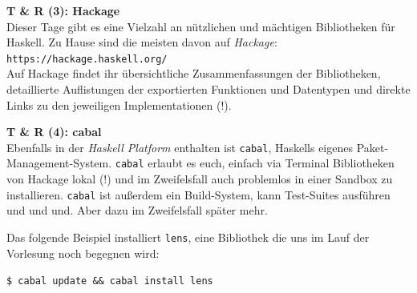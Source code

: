 \documentclass{beamer}
\begin{document}
  
  \begin{frame}
    \begin{center}
    \Large\textbf{T \& R (3): Hackage}\\ \bigskip \normalsize
    Dieser Tage gibt es eine Vielzahl an nützlichen und mächtigen Bibliotheken für Haskell. Zu Hause sind die meisten davon auf \emph{Hackage}: \\ \bigskip \texttt{https://hackage.haskell.org/} \\ \bigskip
    Auf Hackage findet ihr übersichtliche Zusammenfassungen der Bibliotheken, detaillierte Auflistungen der exportierten Funktionen und Datentypen und direkte Links zu den jeweiligen Implementationen (!).
    \end{center}
  \end{frame}
  
  
  \begin{frame}
    \begin{center}
    \Large\textbf{T \& R (4): cabal}\\ \bigskip \normalsize
    Ebenfalls in der \emph{Haskell Platform} enthalten ist \texttt{cabal}, Haskells eigenes Paket-Management-System. \texttt{cabal} erlaubt es euch, einfach via Terminal Bibliotheken von Hackage lokal (!) und im Zweifelsfall auch problemlos in einer Sandbox zu installieren. \texttt{cabal} ist außerdem ein Build-System, kann Test-Suites ausführen und und und. Aber dazu im Zweifelsfall später mehr.\bigskip
    
    Das folgende Beispiel installiert \texttt{lens}, eine Bibliothek die uns im Lauf der Vorlesung noch begegnen wird:\bigskip
   
    \texttt{\$ cabal update \&\& cabal install lens}
    
    
    \end{center}
  \end{frame}
  
  
\end{document}
